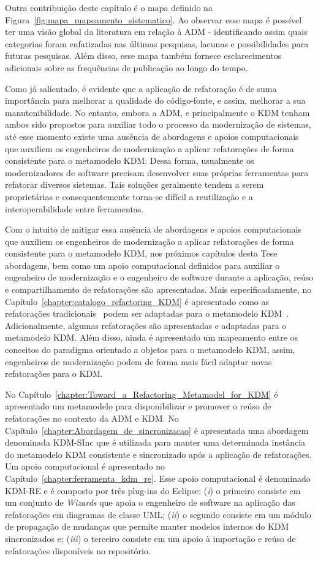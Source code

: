 Outra contribuição deste capítulo é o mapa definido na Figura~\ref{fig:mapa_mapeamento_sistematico}. Ao observar esse mapa é possível ter uma visão global da literatura em relação à ADM - identificando assim quais categorias foram enfatizadas nas últimas pesquisas, lacunas e possibilidades para futuras pesquisas. Além disso, esse mapa também fornece esclarecimentos adicionais sobre as frequências de publicação ao longo do tempo.

Como já salientado, é evidente que a aplicação de refatoração é de suma importância para melhorar a qualidade do código-fonte, e assim, melhorar a sua manutenibilidade.
No entanto, embora a ADM, e principalmente o KDM tenham ambos sido propostos para auxiliar todo o processo da modernização de sistemas, até esse momento existe uma ausência de abordagens e apoios computacionais que auxiliem os engenheiros de modernização a aplicar refatorações de forma consistente para o metamodelo KDM. Dessa forma, usualmente os modernizadores de software precisam desenvolver suas próprias ferramentas para refatorar diversos sistemas. Tais soluções geralmente tendem a serem proprietárias e consequentemente torna-se difícil a reutilização e a interoperabilidade entre ferramentas. 

Com o intuito de mitigar essa ausência de abordagens e apoios computacionais que auxiliem os engenheiros de modernização a aplicar refatorações de forma consistente para o metamodelo KDM, nos próximos capítulos desta Tese abordagens, bem como um apoio computacional definidos para auxiliar o engenheiro de modernização e o engenheiro de software durante a aplicação, reúso e compartilhamento de refatorações são apresentadas. Mais especificadamente, no Capítulo~\ref{chapter:catalogo_refactoring_KDM} é apresentado como as refatorações tradicionais~\cite{Fowler1999} podem ser adaptadas para o metamodelo KDM~\cite{durelli_catalogo, durelli_VEM_ferramenta}. Adicionalmente, algumas refatorações são apresentadas e adaptadas para o metamodelo KDM. Além disso, ainda é apresentado um mapeamento entre os conceitos do paradigma orientado a objetos para o metamodelo KDM, assim, engenheiros de modernização podem de forma mais fácil adaptar novas refatorações para o KDM.

No Capítulo~\ref{chapter:Toward_a_Refactoring_Metamodel_for_KDM} é apresentado um metamodelo para disponibilizar e promover o reúso de refatorações no contexto da ADM e KDM. No Capítulo~\ref{chapter:Abordagem_de_sincronizacao} é apresentada uma abordagem denominada KDM-SInc que é utilizada para manter uma determinada instância do metamodelo KDM consistente e sincronizado após a aplicação de refatorações. Um apoio computacional é apresentado no Capítulo~\ref{chapter:ferramenta_kdm_re}. Esse apoio computacional é denominado KDM-RE e é composto por três plug-ins do Eclipse: (\textit{i}) o primeiro consiste em um conjunto de \textit{Wizards} que apoia o engenheiro de software na aplicação das refatorações em diagramas de classe UML; (\textit{ii}) o segundo consiste em um módulo de propagação de mudanças que permite manter modelos internos do KDM sincronizados e; (\textit{iii}) o terceiro consiste em um apoio à importação e reúso de refatorações disponíveis no repositório.